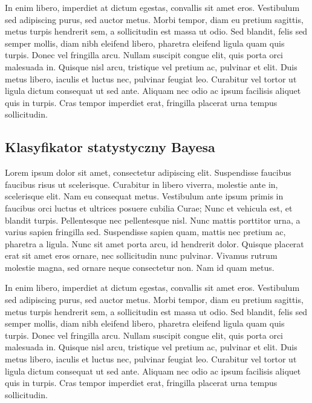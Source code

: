 	In enim libero, imperdiet at dictum egestas, convallis sit amet eros. Vestibulum sed adipiscing purus, sed auctor metus. Morbi tempor, diam eu pretium sagittis, metus turpis hendrerit sem, a sollicitudin est massa ut odio. Sed blandit, felis sed semper mollis, diam nibh eleifend libero, pharetra eleifend ligula quam quis turpis. Donec vel fringilla arcu. Nullam suscipit congue elit, quis porta orci malesuada in. Quisque nisl arcu, tristique vel pretium ac, pulvinar et elit. Duis metus libero, iaculis et luctus nec, pulvinar feugiat leo. Curabitur vel tortor ut ligula dictum consequat ut sed ante. Aliquam nec odio ac ipsum facilisis aliquet quis in turpis. Cras tempor imperdiet erat, fringilla placerat urna tempus sollicitudin.
	
	\subsection{Klasyfikator statystyczny Bayesa}
	Lorem ipsum dolor sit amet, consectetur adipiscing elit. Suspendisse faucibus faucibus risus ut scelerisque. Curabitur in libero viverra, molestie ante in, scelerisque elit. Nam eu consequat metus. Vestibulum ante ipsum primis in faucibus orci luctus et ultrices posuere cubilia Curae; Nunc et vehicula est, et blandit turpis. Pellentesque nec pellentesque nisl. Nunc mattis porttitor urna, a varius sapien fringilla sed. Suspendisse sapien quam, mattis nec pretium ac, pharetra a ligula. Nunc sit amet porta arcu, id hendrerit dolor. Quisque placerat erat sit amet eros ornare, nec sollicitudin nunc pulvinar. Vivamus rutrum molestie magna, sed ornare neque consectetur non. Nam id quam metus.

	In enim libero, imperdiet at dictum egestas, convallis sit amet eros. Vestibulum sed adipiscing purus, sed auctor metus. Morbi tempor, diam eu pretium sagittis, metus turpis hendrerit sem, a sollicitudin est massa ut odio. Sed blandit, felis sed semper mollis, diam nibh eleifend libero, pharetra eleifend ligula quam quis turpis. Donec vel fringilla arcu. Nullam suscipit congue elit, quis porta orci malesuada in. Quisque nisl arcu, tristique vel pretium ac, pulvinar et elit. Duis metus libero, iaculis et luctus nec, pulvinar feugiat leo. Curabitur vel tortor ut ligula dictum consequat ut sed ante. Aliquam nec odio ac ipsum facilisis aliquet quis in turpis. Cras tempor imperdiet erat, fringilla placerat urna tempus sollicitudin.
	
